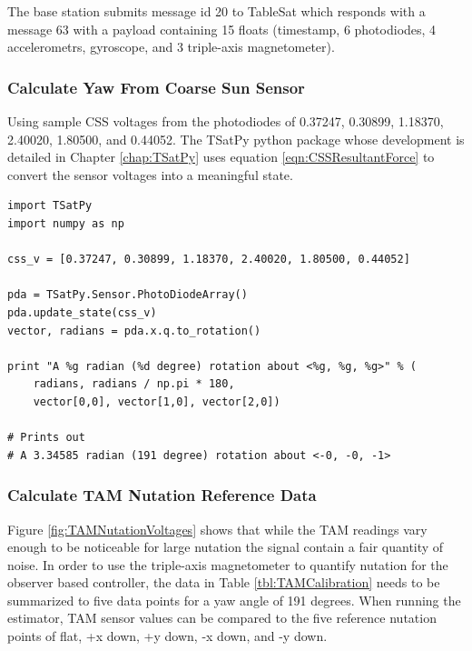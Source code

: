 The base station submits message id 20 to TableSat which responds with a message 63 with a payload containing 15 floats (timestamp, 6 photodiodes, 4 accelerometrs, gyroscope, and 3 triple-axis magnetometer).

\subsubsection{Calculate Yaw From Coarse Sun Sensor}

Using sample CSS voltages from the photodiodes of 0.37247, 0.30899, 1.18370, 2.40020, 1.80500, and 0.44052.  The TSatPy python package whose development is detailed in Chapter \ref{chap:TSatPy} uses equation \ref{eqn:CSSResultantForce} to convert the sensor voltages into a meaningful state.

\begin{singlespace}
  \begin{verbatim}
import TSatPy
import numpy as np

css_v = [0.37247, 0.30899, 1.18370, 2.40020, 1.80500, 0.44052]

pda = TSatPy.Sensor.PhotoDiodeArray()
pda.update_state(css_v)
vector, radians = pda.x.q.to_rotation()

print "A %g radian (%d degree) rotation about <%g, %g, %g>" % (
    radians, radians / np.pi * 180,
    vector[0,0], vector[1,0], vector[2,0])

# Prints out
# A 3.34585 radian (191 degree) rotation about <-0, -0, -1>
  \end{verbatim}
  \nocite{minted}
\end{singlespace}

\subsubsection{Calculate TAM Nutation Reference Data}

Figure \ref{fig:TAMNutationVoltages} shows that while the TAM readings vary enough to be noticeable for large nutation the signal contain a fair quantity of noise.  In order to use the triple-axis magnetometer to quantify nutation for the observer based controller, the data in Table \ref{tbl:TAMCalibration} needs to be summarized to five data points for a yaw angle of 191 degrees.  When running the estimator, TAM sensor values can be compared to the five reference nutation points of flat, +x down, +y down, -x down, and -y down.

